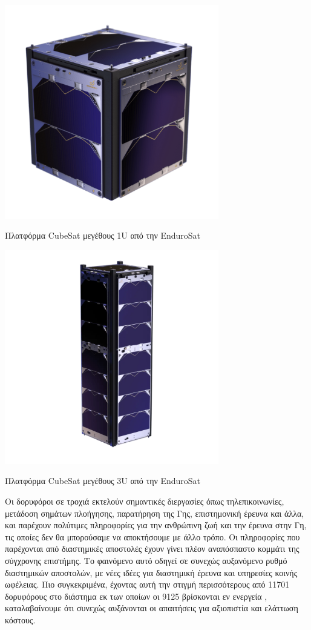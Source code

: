 \documentclass[a4paper,nobib,justified]{tufte-book}
\begin{document}
\begin{marginfigure}
	\includegraphics[width=0.7\textwidth]{media/images/endurosat-platforms/1u.png}
	\caption{Πλατφόρμα CubeSat μεγέθους 1U από την EnduroSat \parencite{1UEndurosat}}
\end{marginfigure}

\begin{marginfigure}
	\includegraphics[width=0.7\textwidth]{media/images/endurosat-platforms/3u.png}
	\caption{Πλατφόρμα CubeSat μεγέθους 3U από την EnduroSat \parencite{3UEndurosat}}
\end{marginfigure}

Οι δορυφόροι σε τροχιά εκτελούν σημαντικές διεργασίες όπως τηλεπικοινωνίες, μετάδοση σημάτων πλοήγησης, παρατήρηση της Γης, επιστημονική έρευνα και άλλα, και παρέχουν πολύτιμες πληροφορίες για την ανθρώπινη ζωή και την έρευνα στην Γη, τις οποίες δεν θα μπορούσαμε να αποκτήσουμε με άλλο τρόπο. Οι πληροφορίες που παρέχονται από διαστημικές αποστολές έχουν γίνει πλέον αναπόσπαστο κομμάτι της σύγχρονης επιστήμης. Το φαινόμενο αυτό οδηγεί σε συνεχώς αυξανόμενο ρυθμό διαστημικών αποστολών, με νέες ιδέες για διαστημική έρευνα και υπηρεσίες κοινής ωφέλειας. Πιο συγκεκριμένα, έχοντας αυτή την στιγμή περισσότερους από 11701 δορυφόρους στο διάστημα εκ των οποίων οι 9125 βρίσκονται εν ενεργεία , καταλαβαίνουμε ότι συνεχώς αυξάνονται οι απαιτήσεις για αξιοπιστία και ελάττωση κόστους.
\end{document}
